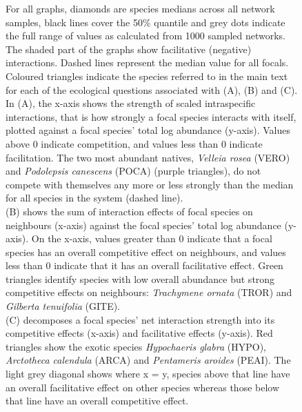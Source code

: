 \documentclass[a4,12pt]{article}
\begin{document}
    \addtocounter{figure}{-1}
    \begin{figure} [t!]
        \caption{For all graphs, diamonds are species medians across all network samples, black lines cover the 50\% quantile and grey dots indicate the full range of values as calculated from 1000 sampled networks. The shaded part of the graphs show facilitative (negative) interactions. Dashed lines represent the median value for all focals. Coloured triangles indicate the species referred to in the main text for each of the ecological questions associated with (A), (B) and (C). \\
        In (A), the x-axis shows the strength of scaled intraspecific interactions, that is how strongly a focal species interacts with itself, plotted against a focal species' total log abundance (y-axis). Values above $0$ indicate competition, and values less than $0$ indicate facilitation.  The two most abundant natives, \textit{Velleia rosea} (VERO) and \textit{Podolepsis canescens} (POCA) (purple triangles), do not compete with themselves any more or less strongly than the median for all species in the system (dashed line). \\
        (B) shows the sum of interaction effects of focal species on neighbours (x-axis) against the focal species' total log abundance (y-axis). On the x-axis, values greater than $0$ indicate that a focal species has an overall competitive effect on neighbours, and values less than $0$ indicate that it has an overall facilitative effect. Green triangles identify species with low overall abundance but strong competitive effects on neighbours: \textit{Trachymene ornata} (TROR) and \textit{Gilberta tenuifolia} (GITE). \\
        (C) decomposes a focal species' net interaction strength into its competitive effects (x-axis) and facilitative effects (y-axis). Red triangles show the exotic species \textit{Hypochaeris glabra} (HYPO), \textit{Arctotheca calendula} (ARCA) and \textit{Pentameris aroides} (PEAI). The light grey diagonal shows where x = y, species above that line have an overall facilitative effect on other species whereas those below that line have an overall competitive effect.} 
    \end{figure}

\clearpage
\newpage
\end{document}

